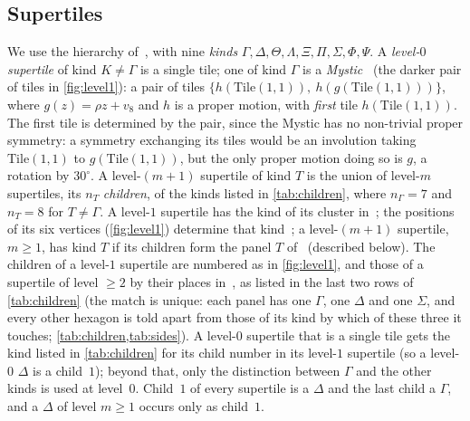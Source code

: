 \documentclass[11pt]{amsart}
\theoremstyle{definition}
\theoremstyle{remark}
\newcommand{\Tile}{\mathrm{Tile}(1,1)}
\begin{document}
\subsection{Supertiles}\label{sec:supertiles}
We use the hierarchy of~\cite{SMKGS-spectre}, with nine \emph{kinds} $\Gamma,\Delta,\Theta,\Lambda,\Xi,\Pi,\Sigma,\Phi,\Psi$.
A \emph{level-$0$ supertile} of kind $K\neq\Gamma$ is a single tile; one of kind $\Gamma$ is a
\emph{Mystic}~\cite[Fig.~2.1]{SMKGS-spectre} (the darker pair of tiles in \cref{fig:level1}): a pair of tiles
$\{h(\Tile),\ h(g(\Tile))\}$, where $g(z)=\rho z+v_8$ and $h$ is a proper motion, with \emph{first} tile $h(\Tile)$. The
first tile is determined by the pair, since the Mystic has no non-trivial proper symmetry: a symmetry exchanging its
tiles would be an involution taking $\Tile$ to $g(\Tile)$, but the only proper motion doing so is $g$, a rotation by
$30^\circ$. A level-$(m+1)$ supertile of kind $T$ is the union of level-$m$ supertiles, its $n_T$ \emph{children}, of
the kinds listed in \cref{tab:children}, where $n_\Gamma=7$ and $n_T=8$ for $T\neq\Gamma$. A level-$1$ supertile has the
kind of its cluster in~\cite[Fig.~4.1]{SMKGS-spectre}; the positions of its six vertices (\cref{fig:level1}) determine
that kind~\cite[proof of Thm.~4.1]{SMKGS-spectre}; a level-$(m+1)$ supertile, $m\ge1$, has kind $T$ if its children form
the panel $T$ of~\cite[Fig.~5.1]{SMKGS-spectre} (described below). The children of a level-$1$ supertile are numbered as in
\cref{fig:level1}, and those of a supertile of level $\ge2$ by their places in~\cite[Fig.~5.1]{SMKGS-spectre}, as listed
in the last two rows of \cref{tab:children} (the match is unique: each panel has one $\Gamma$, one $\Delta$ and one
$\Sigma$, and every other hexagon is told apart from those of its kind by which of these three it touches;
\cref{tab:children,tab:sides}). A level-$0$ supertile that is a single tile gets the kind listed in
\cref{tab:children} for its child number in its level-$1$ supertile (so a level-$0$ $\Delta$ is a child~$1$); beyond
that, only the distinction between $\Gamma$ and the other kinds is used at level~$0$. Child~$1$ of every supertile is a
$\Delta$ and the last child a $\Gamma$, and a $\Delta$ of level $m\ge1$ occurs only as child~$1$.
\end{document}
